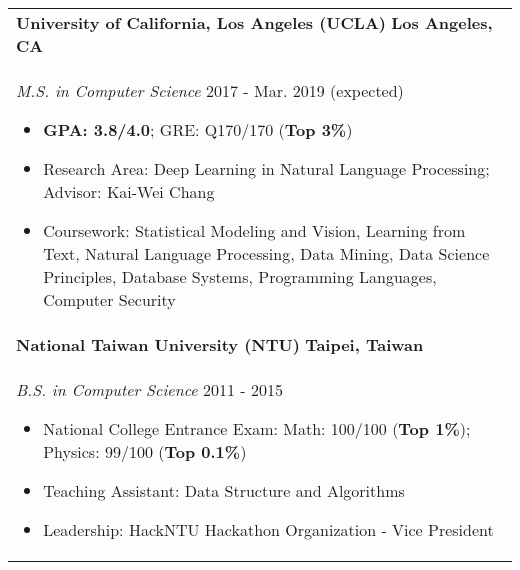 \documentclass[letterpaper,11pt]{article} %
\begin{document}
{%
\begin{tabular}{p{18.5cm}}
{\bf{University of California, Los Angeles (UCLA)}}  \hfill \bf{Los Angeles, CA}\\
{\it M.S. in Computer Science} \hfill  2017 - Mar. 2019 (expected)
\begin{itemize}
\item \textbf{GPA: 3.8/4.0}; GRE: Q170/170 (\textbf{Top 3\%})
\item Research Area: Deep Learning in Natural Language Processing; Advisor: Kai-Wei Chang 
\item Coursework: Statistical Modeling and Vision, Learning from Text, Natural Language Processing, Data Mining, Data Science Principles, Database Systems, Programming Languages, Computer Security 
\vspace*{-\baselineskip}%
\end{itemize}\\ 
\vspace{.1mm}
%
{\bf{National Taiwan University (NTU)}} \hfill \bf{Taipei, Taiwan}\\
{\it B.S. in Computer Science} \hfill 2011 - 2015
\begin{itemize}
\item National College Entrance Exam:  Math: 100/100 (\textbf{Top 1\%}); Physics: 99/100 (\textbf{Top 0.1\%}) 
\item Teaching Assistant: Data Structure and Algorithms
\item Leadership: HackNTU Hackathon Organization - Vice President 
\vspace*{-\baselineskip}
\end{itemize} 
\end{tabular}

}
\end{document}
